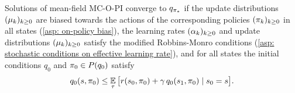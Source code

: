 \begin{lemma}
\label{thm: convergence exact MC-O-PI}
    Solutions of mean-field MC-O-PI converge to $q_{{\pi}_*}$ if the update distributions $(\mu_k)_{k \geq 0}$ are biased towards the actions of the corresponding policies $(\pi_k)_{k \geq 0}$ in all states (\autoref{asp: on-policy bias}),
    the learning rates $(\alpha_k)_{k \geq 0}$ and update distributions $(\mu_k)_{k \geq 0}$ satisfy the modified Robbins-Monro conditions (\autoref{asp: stochastic conditions on effective learning rate}),
    and for all states the initial conditions $q_0$ and $\pi_0 \in P(q_0)$ satisfy
    \begin{align}
    \label{eq: condition to start low enough}
        q_0(s, \pi_0) 
        \leq 
        \operatorname*{\mathbb{E}}_{\tau} \big[ r(s_0, \pi_0) + \gamma \, q_0(s_1, \pi_0) \mid s_0 = s \big] .
    \end{align}
\end{lemma}

